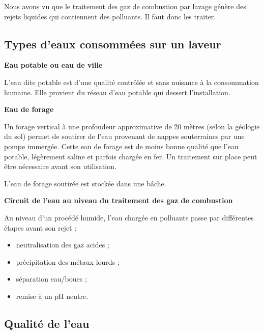 Nous avons vu que le traitement des gaz de combustion par lavage génère des rejets liquides qui contiennent des polluants. Il faut donc les traiter.


\subsection{Types d’eaux consommées sur un laveur} 

\vspace{0.3cm}
\textbf{Eau potable ou eau de ville}
\vspace{0.3cm}

L’eau dite potable est d’une qualité contrôlée et sans nuisance à la consommation humaine.
Elle provient du réseau d’eau potable qui dessert l’installation.

\vspace{0.3cm}
\textbf{Eau de forage}
\vspace{0.3cm}

Un forage vertical à une profondeur approximative de 20 mètres (selon la géologie du sol) permet de soutirer de l’eau provenant de nappes souterraines par une pompe immergée. Cette eau de forage est de moins bonne qualité que l’eau potable, légèrement saline et parfois chargée en fer. Un traitement sur place peut être nécessaire avant son utilisation.
\vspace{0.3cm}

L’eau de forage soutirée est stockée dans une bâche.

\newpage
\vspace{0.3cm}
\textbf{Circuit de l’eau au niveau du traitement des gaz de combustion}
\vspace{0.3cm}


Au niveau d'un procédé humide, l'eau chargée en polluants passe par différentes étapes avant son rejet :
\begin{itemize}
\item neutralisation des gaz acides  ;
\item précipitation des métaux lourds ;
\item séparation eau/boues ;
\item  remise à un pH neutre.
\end{itemize}



\subsection{Qualité de l'eau}

